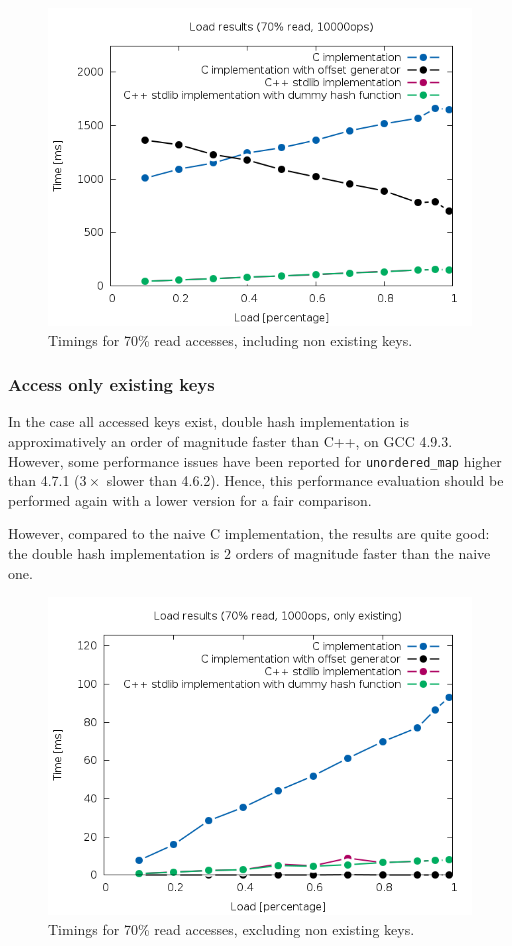 \documentclass[oneside]{article}
\begin{document}
\begin{figure}
	\centering
	\includegraphics[width=\textwidth]{result_example_contains.png}
	\caption{Timings for 70\% read accesses, including non existing keys.}
	\label{fig:result_contains}
\end{figure}

\subsubsection{Access only existing keys}
In the case all accessed keys exist, double hash implementation is approximatively an order of magnitude faster than C++, on GCC 4.9.3. However, some performance issues have been reported for \texttt{unordered\_map} higher than 4.7.1 ($3\times$ slower than 4.6.2). Hence, this performance evaluation should be performed again with a lower version for a fair comparison. 

However, compared to the naive C implementation, the results are quite good: the double hash implementation is $2$ orders of magnitude faster than the naive one.

\begin{figure}
	\centering
	\includegraphics[width=\textwidth]{result_example_no_contains.png}
	\caption{Timings for 70\% read accesses, excluding non existing keys.}
	\label{fig:result_no_contains}
\end{figure}
\end{document}
